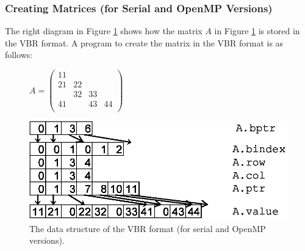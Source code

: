 \documentclass[a4paper]{article}
\begin{document}
\subsubsection{Creating Matrices (for Serial and OpenMP Versions)}
The right diagram in Figure \ref{fig:storage09} shows how the matrix $A$ in Figure \ref{fig:storage09} is stored in the VBR format. A program to create the matrix in the VBR format is as follows:
\begin{figure}[h]
{\centering 
\begin{minipage}{0.3\textwidth}
\begin{flushright}
$ 
A = \left(
\begin{array}{c|cc|c}
11 &    &    &    \\ \hline
21 & 22 &    &    \\
   & 32 & 33 &    \\ \hline
41 &    & 43 & 44 \\
\end{array}\right)
$
\end{flushright}
\end{minipage}
\begin{minipage}{0.6\textwidth}
\begin{flushleft}
\includegraphics{storage09.eps} 
\end{flushleft}
\end{minipage}
\caption{The data structure of the VBR format (for serial and OpenMP versions).}\label{fig:storage09}}
\end{figure}
\end{document}
